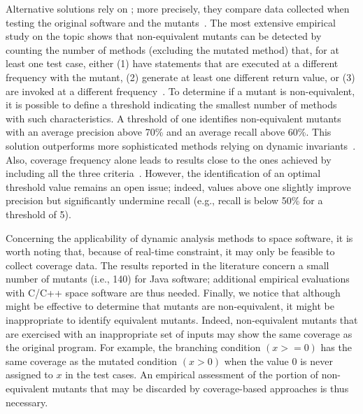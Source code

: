 Alternative solutions rely on ; more precisely, they compare data collected when testing the original software and the mutants~\cite{grun2009impact,schuler2010covering,schuler2013covering,schuler2009efficient}.
The most extensive empirical study on the topic shows that non-equivalent mutants can be detected by counting the number of methods (excluding the mutated method) that, for at least one test case, either (1) have statements that are executed at a different frequency with the mutant, (2) generate at least one different return value, or (3) are invoked at a different frequency~\cite{schuler2013covering}. To determine if a mutant is non-equivalent, it is possible to define a threshold indicating the smallest number of methods with such characteristics. A threshold of one identifies non-equivalent mutants with an average precision above 70\% and an average recall above 60\%. This solution outperforms more sophisticated methods relying on dynamic invariants~\cite{schuler2009efficient}. Also, coverage frequency alone leads to results close to the ones achieved by including all the three criteria~\cite{schuler2013covering}.
However, the identification of an optimal threshold value remains an open issue; indeed, values above one slightly improve precision but significantly undermine recall (e.g., recall is below 50\% for a threshold of 5). 

Concerning the applicability of dynamic analysis methods to space software, it is worth noting that, because of real-time constraint, it may only be feasible to collect coverage data. 
The  results reported in the literature concern a small number of mutants (i.e., 140) for Java software; 
additional empirical evaluations with C/C++ space software are thus needed.
Finally, we notice that although  might be effective to determine that mutants are non-equivalent, it might be inappropriate to identify equivalent mutants. Indeed, 
non-equivalent mutants that are exercised with an inappropriate set of inputs may show the same coverage as the original program. For example, the branching condition $(x >= 0)$ has the same coverage as the mutated condition $(x > 0)$ when the value $0$ is never assigned to $x$ in the test cases. 
An empirical assessment of the portion of non-equivalent mutants that may be discarded by coverage-based approaches is thus necessary.

